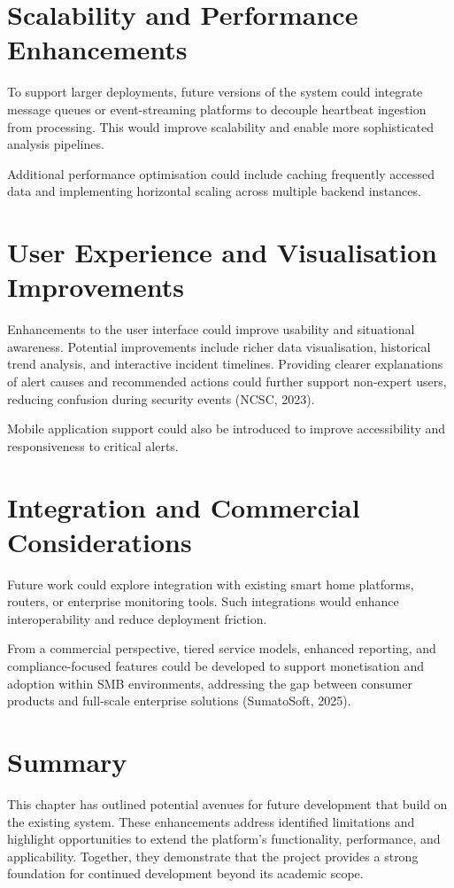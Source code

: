 \section{Scalability and Performance Enhancements}

To support larger deployments, future versions of the system could integrate message queues or event-streaming platforms to decouple heartbeat ingestion from processing. This would improve scalability and enable more sophisticated analysis pipelines.

Additional performance optimisation could include caching frequently accessed data and implementing horizontal scaling across multiple backend instances.

\section{User Experience and Visualisation Improvements}

Enhancements to the user interface could improve usability and situational awareness. Potential improvements include richer data visualisation, historical trend analysis, and interactive incident timelines. Providing clearer explanations of alert causes and recommended actions could further support non-expert users, reducing confusion during security events (NCSC, 2023).

Mobile application support could also be introduced to improve accessibility and responsiveness to critical alerts.

\section{Integration and Commercial Considerations}

Future work could explore integration with existing smart home platforms, routers, or enterprise monitoring tools. Such integrations would enhance interoperability and reduce deployment friction.

From a commercial perspective, tiered service models, enhanced reporting, and compliance-focused features could be developed to support monetisation and adoption within SMB environments, addressing the gap between consumer products and full-scale enterprise solutions (SumatoSoft, 2025).

\section{Summary}

This chapter has outlined potential avenues for future development that build on the existing system. These enhancements address identified limitations and highlight opportunities to extend the platform's functionality, performance, and applicability. Together, they demonstrate that the project provides a strong foundation for continued development beyond its academic scope.
